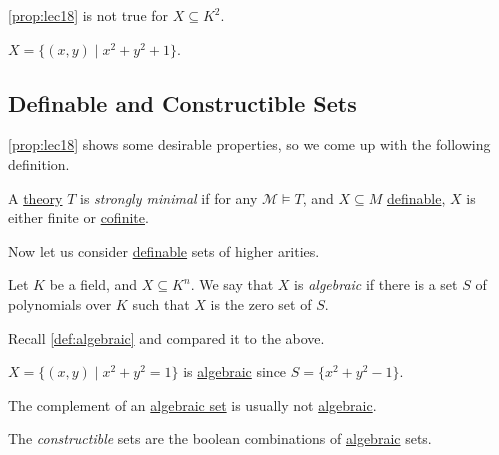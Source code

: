 \begin{remark}
	\autoref{prop:lec18} is not true for \(X \subseteq K^2\).
\end{remark}
\begin{explanation}
	\(X = \{ (x, y) \mid x^2 + y^2 + 1 \} \).
\end{explanation}

\subsection{Definable and Constructible Sets}
\autoref{prop:lec18} shows some desirable properties, so we come up with the following definition.

\begin{definition}\label{def:strongly-minimal}
	A \hyperref[def:theory]{theory} \(T\) is \emph{strongly minimal} if for any \(\mathcal{M} \models T\), and \(X \subseteq M\) \hyperref[def:definable]{definable}, \(X\) is either finite or \hyperref[def:cofinite]{cofinite}.
\end{definition}

Now let us consider \hyperref[def:definable]{definable} sets of higher arities.

\begin{definition}[Algebraic]\label{def:algebraic-set}
	Let \(K\) be a field, and \(X \subseteq K^n\). We say that \(X\) is \emph{algebraic} if there is a set \(S\) of polynomials over \(K\) such that \(X\) is the zero set of \(S\).
\end{definition}

\begin{prev}
	Recall \autoref{def:algebraic} and compared it to the above.
\end{prev}

\begin{eg}
	\(X = \{(x, y) \mid x^2 + y^2 = 1\}\) is \hyperref[def:algebraic]{algebraic} since \(S = \{ x^2 + y^2 -1 \} \).
\end{eg}

The complement of an \hyperref[def:algebraic-set]{algebraic set} is usually not \hyperref[def:algebraic-set]{algebraic}.

\begin{definition}[Constructible]\label{def:constructible}
	The \emph{constructible} sets are the boolean combinations of \hyperref[def:algebraic-set]{algebraic} sets.
\end{definition}


